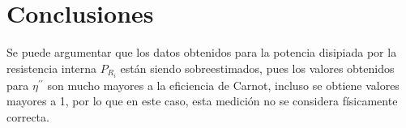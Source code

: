 \section{Conclusiones}

Se puede argumentar que los datos obtenidos para la potencia disipiada por la resistencia interna $P_{R_i}$ están siendo sobreestimados, pues los valores obtenidos para $\eta^{\prime\prime}$ son mucho mayores a la eficiencia de Carnot, incluso se obtiene valores mayores a 1, por lo que en este caso, esta medición no se considera físicamente correcta. 